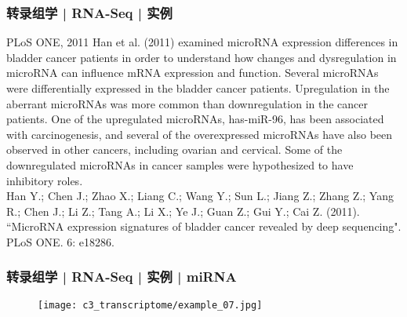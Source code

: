 \begin{frame}
  \frametitle{转录组学 | RNA-Seq | 实例}
  \begin{block}{PLoS ONE, 2011}
  Han et al. (2011) examined microRNA expression differences in bladder cancer patients in order to understand how changes and dysregulation in microRNA can influence mRNA expression and function. Several microRNAs were differentially expressed in the bladder cancer patients. Upregulation in the aberrant microRNAs was more common than downregulation in the cancer patients. One of the upregulated microRNAs, has-miR-96, has been associated with carcinogenesis, and several of the overexpressed microRNAs have also been observed in other cancers, including ovarian and cervical. Some of the downregulated microRNAs in cancer samples were hypothesized to have inhibitory roles.\\
  \vspace{0.5em}
Han Y.; Chen J.; Zhao X.; Liang C.; Wang Y.; Sun L.; Jiang Z.; Zhang Z.; Yang R.; Chen J.; Li Z.; Tang A.; Li X.; Ye J.; Guan Z.; Gui Y.; Cai Z. (2011). ``MicroRNA expression signatures of bladder cancer revealed by deep sequencing". PLoS ONE. 6: e18286.
  \end{block}
\end{frame}

\begin{frame}
  \frametitle{转录组学 | RNA-Seq | 实例 | miRNA}
  \begin{figure}
    \centering
    \texttt{[image: c3\_transcriptome/example\_07.jpg]}
  \end{figure}
\end{frame}
